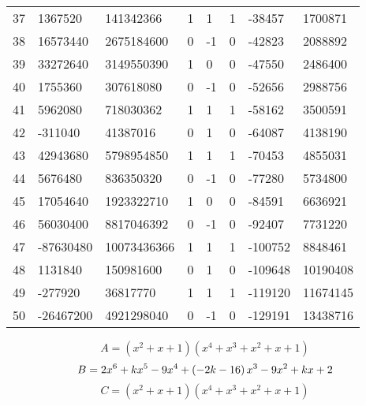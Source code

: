 \documentclass{amsart}
\begin{document}
\begin{longtable}{|l|l|l|lllll|}
37&1367520&141342366&1&1&1&-38457&1700871\\
38&16573440&2675184600&0&-1&0&-42823&2088892\\
39&33272640&3149550390&1&0&0&-47550&2486400\\
40&1755360&307618080&0&-1&0&-52656&2988756\\
41&5962080&718030362&1&1&1&-58162&3500591\\
42&-311040&41387016&0&1&0&-64087&4138190\\
43&42943680&5798954850&1&1&1&-70453&4855031\\
44&5676480&836350320&0&-1&0&-77280&5734800\\
45&17054640&1923322710&1&0&0&-84591&6636921\\
46&56030400&8817046392&0&-1&0&-92407&7731220\\
47&-87630480&10073436366&1&1&1&-100752&8848461\\
48&1131840&150981600&0&1&0&-109648&10190408\\
49&-277920&36817770&1&1&1&-119120&11674145\\
50&-26467200&4921298040&0&-1&0&-129191&13438716\\
\hline
\end{longtable}
$$A=(x^2
 + x
 + 1)(x^4
 + x^3
 + x^2
 + x
 + 1)$$
$$B=2\*x^6
 + k\*x^5
 - 9\*x^4
 + \left(-2\*k
 - 16\right) \*x^3
 - 9\*x^2
 + k\*x
 + 2$$
$$C=(x^2
 + x
 + 1)(x^4
 + x^3
 + x^2
 + x
 + 1)$$
\end{document}

